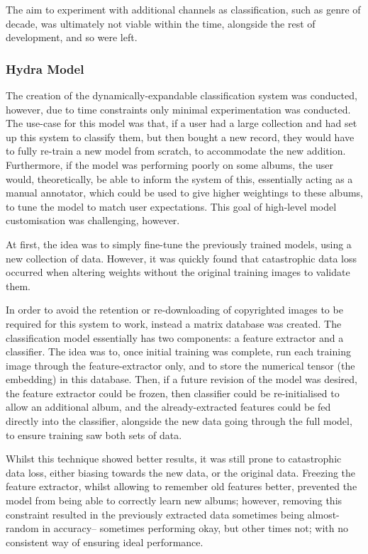                 The aim to experiment with additional channels as classification, such as genre of decade, was ultimately not viable within the time, alongside the rest of development, and so were left.
                
    
            \subsubsection{Hydra Model}
    
                The creation of the dynamically-expandable classification system was conducted, however, due to time constraints only minimal experimentation was conducted. The use-case for this model was that, if a user had a large collection and had set up this system to classify them, but then bought a new record, they would have to fully re-train a new model from scratch, to accommodate the new addition. Furthermore, if the model was performing poorly on some albums, the user would, theoretically, be able to inform the system of this, essentially acting as a manual annotator, which could be used to give higher weightings to these albums, to tune the model to match user expectations. This goal of high-level model customisation was challenging, however.
    
                At first, the idea was to simply fine-tune the previously trained models, using a new collection of data. However, it was quickly found that catastrophic data loss occurred when altering weights without the original training images to validate them.
    
                In order to avoid the retention or re-downloading of copyrighted images to be required for this system to work, instead a matrix database was created. The classification model essentially has two components: a feature extractor and a classifier. The idea was to, once initial training was complete, run each training image through the feature-extractor only, and to store the numerical tensor (the embedding) in this database. Then, if a future revision of the model was desired, the feature extractor could be frozen, then classifier could be re-initialised to allow an additional album, and the already-extracted features could be fed directly into the classifier, alongside the new data going through the full model, to ensure training saw both sets of data.
    
                Whilst this technique showed better results, it was still prone to catastrophic data loss, either biasing towards the new data, or the original data. Freezing the feature extractor, whilst allowing to remember old features better, prevented the model from being able to correctly learn new albums; however, removing this constraint resulted in the previously extracted data sometimes being almost-random in accuracy-- sometimes performing okay, but other times not; with no consistent way of ensuring ideal performance.
    
